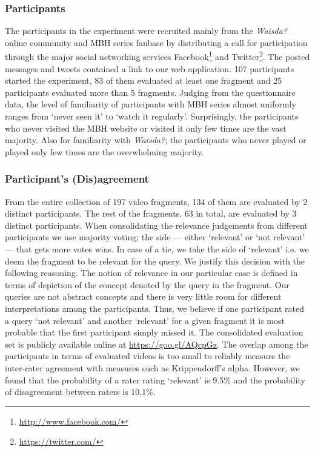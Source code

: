 \subsubsection{Participants}
The participants in the experiment were recruited mainly from the \textit{Waisda?} online community and MBH series fanbase by distributing a call for participation through the major social networking services Facebook\footnote{\url{http://www.facebook.com/}} and Twitter\footnote{\url{https://twitter.com/}}. The posted messages and tweets contained a link to our web application. 107 participants started the experiment, 83 of them evaluated at least one fragment and 25 participants evaluated more than 5 fragments. 
Judging from the questionnaire data, the level of familiarity of participants with MBH series almost uniformly ranges from `never seen it' to `watch it regularly'. Surprisingly, the participants who never visited the MBH website or visited it only few times are the vast majority.  Also for familiarity with \textit{Waisda?}; the participants who never played or played only few times are the overwhelming majority.

\subsubsection{Participant's (Dis)agreement}
From the entire collection of 197 video fragments, 134 of them are evaluated by 2 distinct participants. The rest of the fragments, 63 in total, are evaluated by 3 distinct participants. When consolidating the relevance judgements from different participants we use majority voting; the side --- either `relevant' or `not relevant' --- that gets more votes wins. In case of a tie, we take the side of `relevant' i.e. we deem the fragment to be relevant for the query. We justify this decision with the following reasoning. The notion of relevance in our particular case is defined in terms of depiction of the concept denoted by the query in the fragment. Our queries are not abstract concepts and there is very little room for different interpretations among the participants. Thus, we believe if one participant rated  a query `not relevant' and another `relevant' for a given fragment it is most probable that the first participant simply missed it. The consolidated evaluation set is publicly available online at \url{https://goo.gl/AQcpGz}. 
The overlap among the participants in terms of evaluated videos is too small to reliably measure the inter-rater agreement with measures such as Krippendorff's alpha. However, we found that the probability of a rater rating `relevant' is 9.5\% and the probability of disagreement between raters is 10.1\%.


